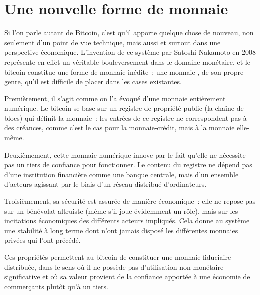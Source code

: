 \section*{Une nouvelle forme de monnaie}

Si l'on parle autant de Bitcoin, c'est qu'il apporte quelque chose de nouveau, non seulement d'un point de vue technique, mais aussi et surtout dans une perspective économique. L'invention de ce système par Satoshi Nakamoto en 2008 représente en effet un véritable bouleversement dans le domaine monétaire, et le bitcoin constitue une forme de monnaie inédite~: une monnaie , de son propre genre, qu'il est difficile de placer dans les cases existantes.

Premièrement, il s'agit comme on l'a évoqué d'une monnaie entièrement numérique. Le bitcoin se base sur un registre de propriété public (la chaîne de blocs) qui définit la monnaie~: les entrées de ce registre ne correspondent pas à des créances, comme c'est le cas pour la monnaie-crédit, mais à la monnaie elle-même.

Deuxièmement, cette monnaie numérique innove par le fait qu'elle ne nécessite pas un tiers de confiance pour fonctionner. Le contenu du registre ne dépend pas d'une institution financière comme une banque centrale, mais d'un ensemble d'acteurs agissant par le biais d'un réseau distribué d'ordinateurs.

Troisièmement, sa sécurité est assurée de manière économique~: elle ne repose pas sur un bénévolat altruiste (même s'il joue évidemment un rôle), mais sur les incitations économiques des différents acteurs impliqués. Cela donne au système une stabilité à long terme dont n'ont jamais disposé les différentes monnaies privées qui l'ont précédé.

Ces propriétés permettent au bitcoin de constituer une monnaie fiduciaire distribuée, dans le sens où il ne possède pas d'utilisation non monétaire significative et où sa valeur provient de la confiance apportée à une économie de commerçants plutôt qu'à un tiers. %

